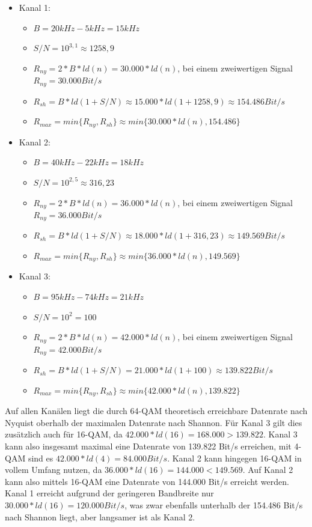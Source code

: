 \documentclass{../exercisesheet}
\begin{document}
\begin{exercise}{4.5}
	\begin{subexercise}
		\begin{itemize}
			\item Kanal 1:
			\begin{itemize}
				\item $B = 20kHz - 5kHz=15kHz$
				\item $S/N=10^{3,1}\approx 1258,9$
				\item $R_{ny}=2*B*ld(n)=30.000*ld(n)$, bei einem zweiwertigen Signal $R_{ny} = 30.000 Bit/s$
				\item $R_{sh} = B*ld(1+S/N) \approx 15.000*ld(1+1258,9) \approx 154.486 Bit/s$
				\item $R_{max}=min\{R_{ny},R_{sh}\}\approx min\{30.000*ld(n), 154.486\}$
			\end{itemize}
			\item Kanal 2:
			\begin{itemize}
				\item $B = 40kHz - 22kHz=18kHz$
				\item $S/N=10^{2,5}\approx 316,23$
				\item $R_{ny}=2*B*ld(n)=36.000*ld(n)$, bei einem zweiwertigen Signal $R_{ny} = 36.000 Bit/s$
				\item $R_{sh} = B*ld(1+S/N) \approx 18.000*ld(1+316,23) \approx 149.569 Bit/s$
				\item $R_{max}=min\{R_{ny},R_{sh}\}\approx min\{36.000*ld(n), 149.569\}$
			\end{itemize}
			\item Kanal 3:
			\begin{itemize}
				\item $B = 95kHz - 74kHz=21kHz$
				\item $S/N=10^{2} = 100$
				\item $R_{ny}=2*B*ld(n)=42.000*ld(n)$, bei einem zweiwertigen Signal $R_{ny} = 42.000 Bit/s$
				\item $R_{sh} = B*ld(1+S/N) = 21.000*ld(1+100) \approx 139.822 Bit/s$
				\item $R_{max}=min\{R_{ny},R_{sh}\}\approx min\{42.000*ld(n), 139.822\}$
			\end{itemize}
		\end{itemize}	
	\end{subexercise}

	\begin{subexercise}
	Auf allen Kanälen liegt die durch 64-QAM theoretisch erreichbare Datenrate nach Nyquist oberhalb der maximalen Datenrate nach Shannon. Für Kanal 3 gilt dies zusätzlich auch für 16-QAM, da $42.000*ld(16)=168.000>139.822$. Kanal 3 kann also insgesamt maximal eine Datenrate von 139.822 Bit/s erreichen, mit 4-QAM sind es $42.000*ld(4)=84.000 Bit/s$. Kanal 2 kann hingegen 16-QAM in vollem Umfang nutzen, da $36.000*ld(16)=144.000<149.569$. Auf Kanal 2 kann also mittels 16-QAM eine Datenrate von 144.000 Bit/s erreicht werden. Kanal 1 erreicht aufgrund der geringeren Bandbreite nur $30.000*ld(16)=120.000 Bit/s$, was zwar ebenfalls unterhalb der 154.486 Bit/s nach Shannon liegt, aber langsamer ist als Kanal 2.
	

\end{subexercise}
\end{exercise}
\end{document}
